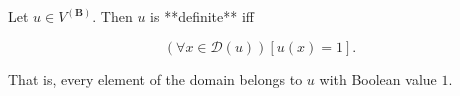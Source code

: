 Let $u \in V^{(\mathbf{B})}$. Then $u$ is **definite** iff

$$(\forall x \in \mathcal{D}(u))[u(x) = 1].$$

That is, every element of the domain belongs to $u$ with Boolean value $1$.
